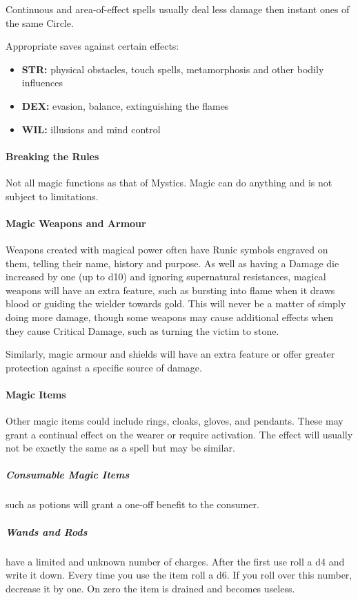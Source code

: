 \documentclass[itdr]{subfiles}
\begin{document}
Continuous and area-of-effect spells usually deal less damage then instant ones of the same Circle.

Appropriate saves against certain effects:
\begin{itemize}
	\item \textbf{STR:} physical obstacles, touch spells, metamorphosis and other bodily influences
	\item \textbf{DEX:} evasion, balance, extinguishing the flames
	\item \textbf{WIL:} illusions and mind control
\end{itemize}

\vfill
\break

\paragraph{Breaking the Rules}
Not all magic functions as that of Mystics. Magic can do anything and is not subject to limitations.

\paragraph{Magic Weapons and Armour}
Weapons created with magical power often have Runic symbols engraved on them, telling their name, history and purpose. As well as having a Damage die increased by one (up to d10) and ignoring supernatural resistances, magical weapons will have an extra feature, such as bursting into flame when it draws blood or guiding the wielder towards gold. This will never be a matter of simply doing more damage, though some weapons may cause additional effects when they cause Critical Damage, such as turning the victim to stone.

Similarly, magic armour and shields will have an extra feature or offer greater protection against a specific source of damage.

\paragraph{Magic Items}
Other magic items could include rings, cloaks, gloves, and pendants. These may grant a continual effect on the wearer or require activation. The effect will usually not be exactly the same as a spell but may be similar.

\subparagraph{Consumable Magic Items} such as potions will grant a one-off benefit to the consumer.

\subparagraph{Wands and Rods} have a limited and unknown number of charges. After the first use roll a d4 and write it down. Every time you use the item roll a d6. If you roll over this number, decrease it by one. On zero the item is drained and becomes useless.

\end{document}
